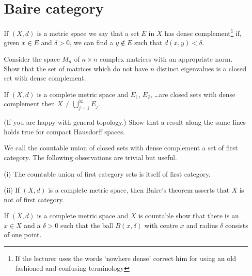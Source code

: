 \section{Baire category} If $(X,d)$ is a metric space
we say that a set $E$ in $X$ has dense 
complement\footnote{If the lecturer uses the words
`nowhere dense' correct him for using an old fashioned
and confusing terminology} if,
given $x\in E$ and $\delta>0$, we can find a $y\notin E$
such that $d(x,y)<\delta$.
\begin{exercise} Consider the space $M_{n}$ of $n\times n$
complex matrices with an appropriate norm. Show that
the set of matrices which do not have $n$ distinct
eigenvalues is a closed set with dense complement.
\end{exercise}

\begin{theorem}
If $(X,d)$ is a complete metric
space and $E_{1}$, $E_{2}$, \dots are
closed sets with dense complement
then $X\neq \bigcup_{j=1}^{\infty}E_{j}$.
\end{theorem}
\begin{exercise} (If you are happy with general topology.)
Show that a result along the same lines holds true
for compact Hausdorff spaces.
\end{exercise}
We call the countable union of closed
sets with dense complement
a set of first category. The following observations
are trivial but useful.
\begin{lemma} (i) The countable union of first
category sets is itself of first category.

(ii) If $(X,d)$ is a complete metric
space, then Baire's theorem asserts that $X$
is not of first category.
\end{lemma}
\begin{exercise}
If $(X,d)$ is a complete metric space
and $X$ is countable show that there
is an $x\in X$ and a $\delta>0$ such that
the ball $B(x,\delta)$ with centre $x$ and
radius $\delta$ consists of one point.
\end{exercise}

